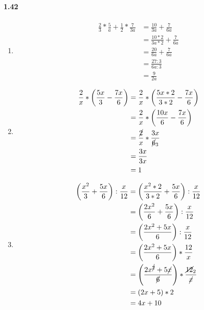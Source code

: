 \documentclass{article}
\newcommand\litem[1]{\item{\bfseries#1\space}}
\begin{document}
\paragraph{1.42}
\begin{enumerate}[label=\emph{\alph*})]
\litem{
\begin{align*}
  \frac{2}{3} * \frac{5}{a} + \frac{1}{2} * \frac{7}{3a} &= \frac{10}{3a} + \frac{7}{6a} \\
  &= \frac{10 * 2}{3a * 2} + \frac{7}{6a} \\
  &= \frac{20}{6a} + \frac{7}{6a} \\
  &= \frac{27:3}{6a:3} \\
  &= \frac{9}{2a}
\end{align*}
}
\litem{
\begin{align*}
  \frac{2}{x} * \left(\frac{5x}{3} - \frac{7x}{6}\right) &= \frac{2}{x} * \left(\frac{5x * 2}{3 * 2} - \frac{7x}{6}\right) \\
  &= \frac{2}{x} * \left(\frac{10x}{6} - \frac{7x}{6}\right) \\
  &= \frac{\cancel{2}}{x} * \frac{3x}{\cancel{6}_3} \\
  &= \frac{3x}{3x} \\
  &= 1
\end{align*}
}
\litem{
\begin{align*}
  \left(\frac{x^2}{3} + \frac{5x}{6}\right) : \frac{x}{12} &= \left(\frac{x^2 * 2}{3 * 2} + \frac{5x}{6}\right) : \frac{x}{12} \\
  &= \left(\frac{2x^2}{6} + \frac{5x}{6}\right) : \frac{x}{12} \\
  &= \left(\frac{2x^2 + 5x}{6}\right): \frac{x}{12} \\ 
  &= \left(\frac{2x^2 + 5x}{6}\right) * \frac{12}{x} \\
  &= \left(\frac{2x^{\cancel{2}} + 5\cancel{x}}{\cancel{6}}\right) * \frac{\cancel{12}_2}{\cancel{x}} \\
  &= \left(2x + 5\right) * 2 \\
  &= 4x + 10
\end{align*}
}
\end{enumerate}
\end{document}
